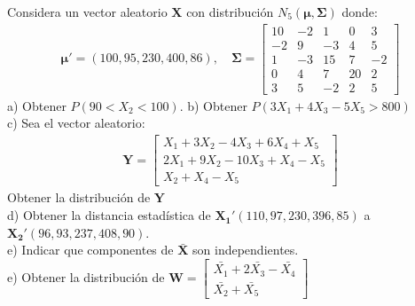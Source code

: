 \documentclass[12pt]{article}
\newenvironment{problem}[2][Problema]{\begin{trivlist}
\item[\hskip \labelsep {\bfseries #1}\hskip \labelsep {\bfseries #2.}]}{\end{trivlist}}
\begin{document}

\begin{problem}{1}
Considera un vector aleatorio $\mathbf{X}$ con distribución $N_5(\mathbf{\mu,\Sigma})$ donde:
\begin{align*}
\mathbf{\mu}' = (100,95,230,400,86), \quad \mathbf{\Sigma}=
\begin{bmatrix}
10 & -2 & 1 & 0 & 3 \\
-2 & 9 & -3 & 4 & 5 \\
1 & -3 & 15 & 7 & -2 \\
0 & 4 & 7 & 20 & 2 \\
3 & 5 & -2 & 2 & 5
\end{bmatrix}
\end{align*}
a) Obtener $P(90<X_2<100)$. b) Obtener $P(3X_1+4X_3-5X_5>800)$ \\
c) Sea el vector aleatorio:
\begin{align*}
\mathbf{Y}= \begin{bmatrix}
X_1+3X_2-4X_3+6X_4+X_5\\
2X_1+9X_2-10X_3+X_4-X_5\\
X_2+X_4-X_5
\end{bmatrix}
\end{align*}
Obtener la distribución de $\mathbf{Y}$\\
d) Obtener la distancia estadística de $\mathbf{X_1}'(110, 97, 230, 396, 85)$ a $\mathbf{X_2}'(96, 93, 237, 408, 90)$.\\
e) Indicar que componentes de $\mathbf{\bar{X}}$ son independientes.\\
e) Obtener la distribución de $\mathbf{W}= \begin{bmatrix}
\bar{X_1} + 2\bar{X_3}-\bar{X_4} \\
\bar{X_2}+\bar{X_5}
\end{bmatrix}$
\end{problem}
\end{document}
